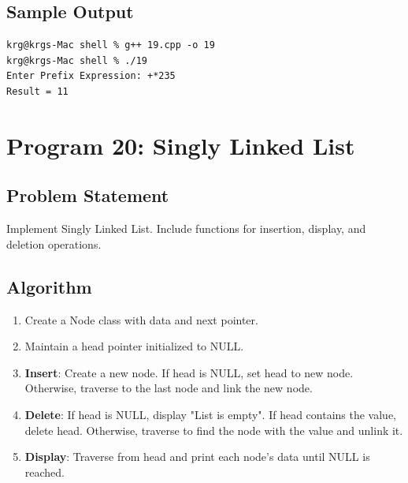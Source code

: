 \documentclass[a4paper,12pt]{article}
\begin{document}
\subsection*{Sample Output}
\begin{lstlisting}[style=outputstyle]
krg@krgs-Mac shell % g++ 19.cpp -o 19
krg@krgs-Mac shell % ./19
Enter Prefix Expression: +*235
Result = 11
\end{lstlisting}

\newpage

\section*{Program 20: Singly Linked List}

\subsection*{Problem Statement}
Implement Singly Linked List. Include functions for insertion, display, and deletion operations.

\subsection*{Algorithm}
\begin{enumerate}
    \item Create a Node class with data and next pointer.
    \item Maintain a head pointer initialized to NULL.
    \item \textbf{Insert}: Create a new node. If head is NULL, set head to new node. Otherwise, traverse to the last node and link the new node.
    \item \textbf{Delete}: If head is NULL, display "List is empty". If head contains the value, delete head. Otherwise, traverse to find the node with the value and unlink it.
    \item \textbf{Display}: Traverse from head and print each node's data until NULL is reached.
\end{enumerate}
\end{document}
